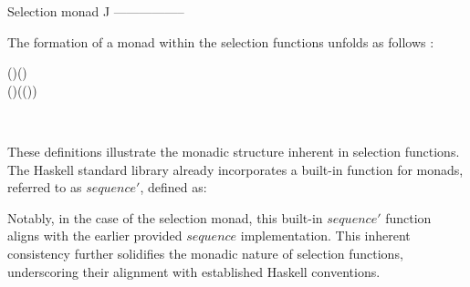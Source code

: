 Selection monad J
-----------------

The formation of a monad within the selection functions unfolds as follows 
\cite{escardo2010selection}:
\begin{hscode}\SaveRestoreHook
{}%
%
%
\>[3]{}(\bind )\mathbin{::}\;\;\to (\to {}\;\;)\to {}\;\;\<[E]%
\\
\>[3]{}(\bind )\;\;\;\mathrel{=}\;(\;(\mathbin{\circ}\;\;))\;\<[E]%
\ColumnHook
\end{hscode}\resethooks
\begin{hscode}\SaveRestoreHook
{}%
%
%
\>[3]{}\mathbin{::}\to {}\;\;\<[E]%
\\
\>[3]{}\;\;\mathrel{=}\<[E]%
\ColumnHook
\end{hscode}\resethooks
These definitions illustrate the monadic structure inherent in selection functions. The 
Haskell standard library already incorporates a built-in function for monads, referred to 
as $sequence'$, defined as:
\resethooks
Notably, in the case of the selection monad, this built-in $sequence'$ function aligns 
with the earlier provided $sequence$ implementation. This inherent consistency further 
solidifies the monadic nature of selection functions, underscoring their alignment with 
established Haskell conventions. 


